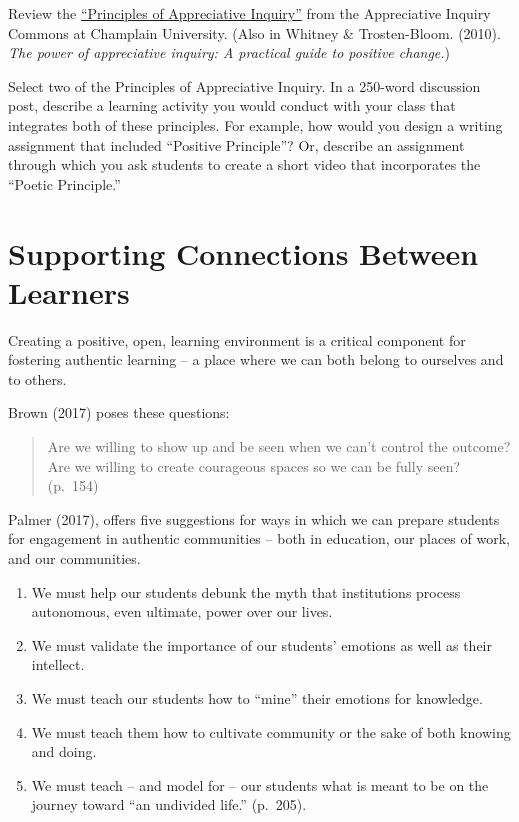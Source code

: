 \documentclass[
]{book}
\providecommand{\tightlist}{%
  \setlength{\itemsep}{0pt}\setlength{\parskip}{0pt}}
\begin{document}
\begin{reflect}
Review the
\href{https://appreciativeinquiry.champlain.edu/learn/appreciative-inquiry-introduction/5-classic-principles-ai/}{``Principles
of Appreciative Inquiry''} from the Appreciative Inquiry Commons at
Champlain University. (Also in Whitney \& Trosten-Bloom. (2010).
\emph{The power of appreciative inquiry: A practical guide to positive
change.})

Select two of the Principles of Appreciative Inquiry. In a 250-word
discussion post, describe a learning activity you would conduct with
your class that integrates both of these principles. For example, how
would you design a writing assignment that included ``Positive
Principle''? Or, describe an assignment through which you ask students
to create a short video that incorporates the ``Poetic Principle.''
\end{reflect}

\hypertarget{supporting-connections-between-learners}{%
\section{Supporting Connections Between Learners}\label{supporting-connections-between-learners}}

Creating a positive, open, learning environment is a critical component for fostering authentic learning -- a place where we can both belong to ourselves and to others.

Brown (2017) poses these questions:

\begin{quote}
Are we willing to show up and be seen when we can't control the outcome? Are we willing to create courageous spaces so we can be fully seen? (p.~154)
\end{quote}

Palmer (2017), offers five suggestions for ways in which we can prepare students for engagement in authentic communities -- both in education, our places of work, and our communities.

\begin{enumerate}
\def\labelenumi{\arabic{enumi}.}
\tightlist
\item
  We must help our students debunk the myth that institutions process autonomous, even ultimate, power over our lives.
\item
  We must validate the importance of our students' emotions as well as their intellect.
\item
  We must teach our students how to ``mine'' their emotions for knowledge.
\item
  We must teach them how to cultivate community or the sake of both knowing and doing.
\item
  We must teach -- and model for -- our students what is meant to be on the journey toward ``an undivided life.'' (p.~205).
\end{enumerate}
\end{document}
